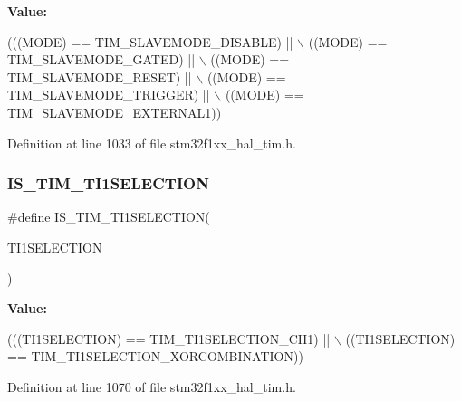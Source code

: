 {\bfseries Value\+:}
\begin{DoxyCode}
(((MODE) == TIM\_SLAVEMODE\_DISABLE) || \(\backslash\)
                                 ((MODE) == TIM\_SLAVEMODE\_GATED)   || \(\backslash\)
                                 ((MODE) == TIM\_SLAVEMODE\_RESET)   || \(\backslash\)
                                 ((MODE) == TIM\_SLAVEMODE\_TRIGGER) || \(\backslash\)
                                 ((MODE) == TIM\_SLAVEMODE\_EXTERNAL1))
\end{DoxyCode}


Definition at line 1033 of file stm32f1xx\+\_\+hal\+\_\+tim.\+h.

\mbox{\label{group___t_i_m___private___macros_ga49724448876e9af44f74959ec7a6cdf5}} 
\subsubsection{\texorpdfstring{I\+S\+\_\+\+T\+I\+M\+\_\+\+T\+I1\+S\+E\+L\+E\+C\+T\+I\+ON}{IS\_TIM\_TI1SELECTION}}
{\footnotesize\ttfamily \#define I\+S\+\_\+\+T\+I\+M\+\_\+\+T\+I1\+S\+E\+L\+E\+C\+T\+I\+ON(\begin{DoxyParamCaption}\item[{}]{T\+I1\+S\+E\+L\+E\+C\+T\+I\+ON }\end{DoxyParamCaption})}

{\bfseries Value\+:}
\begin{DoxyCode}
(((TI1SELECTION) == TIM\_TI1SELECTION\_CH1)            || \(\backslash\)
                                             ((TI1SELECTION) == TIM\_TI1SELECTION\_XORCOMBINATION))
\end{DoxyCode}


Definition at line 1070 of file stm32f1xx\+\_\+hal\+\_\+tim.\+h.

\mbox{\label{group___t_i_m___private___macros_gadf4e4e0422bd9c108b184884781d2d46}} 
